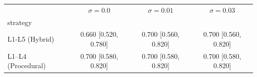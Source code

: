\begin{tabular}{lccc}
\toprule
 & $\sigma=0.0$ & $\sigma=0.01$ & $\sigma=0.03$ \\
strategy &  &  &  \\
\midrule
L1-L5 (Hybrid) & 0.660 [0.520, 0.780] & 0.700 [0.560, 0.820] & 0.700 [0.560, 0.820] \\
L1–L4 (Procedural) & 0.700 [0.580, 0.820] & 0.700 [0.580, 0.820] & 0.700 [0.580, 0.820] \\
\bottomrule
\end{tabular}
